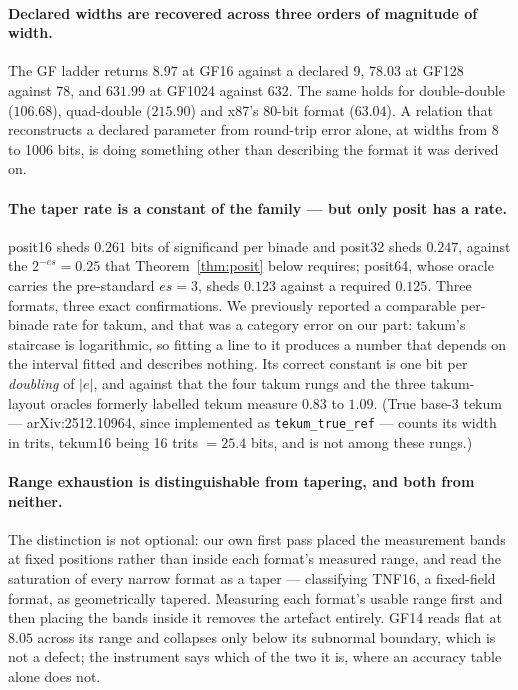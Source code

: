 \documentclass[11pt]{article}
\theoremstyle{definition}
\begin{document}
\paragraph{Declared widths are recovered across three orders of magnitude of
width.} The GF ladder returns $8.97$ at GF16 against a declared 9, $78.03$ at
GF128 against 78, and $631.99$ at GF1024 against 632. The same holds for
double-double ($106.68$), quad-double ($215.90$) and x87's 80-bit format
($63.04$). A relation that reconstructs a declared parameter from round-trip error
alone, at widths from 8 to 1006 bits, is doing something other than describing the
format it was derived on.

\paragraph{The taper rate is a constant of the family --- but only posit has a
rate.} posit16 sheds $0.261$ bits of significand per binade and posit32 sheds
$0.247$, against the $2^{-es} = 0.25$ that Theorem~\ref{thm:posit} below requires;
posit64, whose oracle carries the pre-standard $es = 3$, sheds $0.123$ against a
required $0.125$. Three formats, three exact confirmations. We previously reported
a comparable per-binade rate for takum, and that was a category error on our part:
takum's staircase is logarithmic, so fitting a line to it produces a number that
depends on the interval fitted and describes nothing. Its correct constant is one
bit per \emph{doubling} of $|e|$, and against that the four takum rungs and the
three takum-layout oracles formerly labelled tekum measure $0.83$ to $1.09$.
(True base-3 tekum --- arXiv:2512.10964, since implemented as
\texttt{tekum\_true\_ref} --- counts its width in trits, tekum16 being 16 trits
$= 25.4$ bits, and is not among these rungs.)

\paragraph{Range exhaustion is distinguishable from tapering, and both from
neither.} The distinction is not optional: our own first pass placed the
measurement bands at fixed positions rather than inside each format's measured
range, and read the saturation of every narrow format as a taper --- classifying
TNF16, a fixed-field format, as geometrically tapered. Measuring each format's
usable range first and then placing the bands inside it removes the artefact
entirely. GF14 reads flat at $8.05$ across its range and collapses only below its
subnormal boundary, which is not a defect; the instrument says which of the two it
is, where an accuracy table alone does not.
\end{document}
